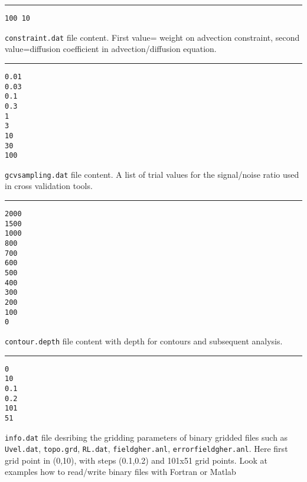 \documentclass[8pt,a4paper,notitlepage]{book}
\begin{document}
\begin{multicols}{2}
\begin{minipage}{9cm}
\rule{\textwidth}{10pt}
{\scriptsize{
\begin{verbatim}
100 10
\end{verbatim}
}}
\makebox[\textwidth]{\hrulefill}
{{\tt constraint.dat} file content. 
First value= weight on advection constraint, second value=diffusion coefficient in advection/diffusion equation.}
\end{minipage}

\begin{minipage}{9cm}
\rule{\textwidth}{10pt}
{\scriptsize{
\begin{verbatim}
0.01
0.03
0.1
0.3
1
3
10
30
100
\end{verbatim}
}}
\makebox[\textwidth]{\hrulefill}
{{\tt gcvsampling.dat} file content. A list of trial values for the signal/noise ratio used in cross validation tools.}
\end{minipage}

\begin{minipage}{9cm}
\rule{\textwidth}{10pt}
{\scriptsize{
\begin{verbatim}
2000
1500
1000
800
700
600
500
400
300
200
100
0
\end{verbatim}
}}
\makebox[\textwidth]{\hrulefill}
{{\tt contour.depth} file content with depth for contours and subsequent analysis.}
\end{minipage}

\begin{minipage}{9cm}
\rule{\textwidth}{10pt}
{\scriptsize{
\begin{verbatim}
0
10
0.1
0.2
101
51
\end{verbatim}
}}
\makebox[\textwidth]{\hrulefill}
{{\tt *info.dat} file desribing the gridding parameters of binary gridded files such as {\tt Uvel.dat}, {\tt topo.grd}, {\tt RL.dat}, {\tt fieldgher.anl}, {\tt errorfieldgher.anl}. Here first grid point in (0,10), with steps (0.1,0.2) and 101x51 grid points. Look at examples how to read/write binary files with Fortran or Matlab}
\end{minipage}



\end{multicols}
\end{document}
